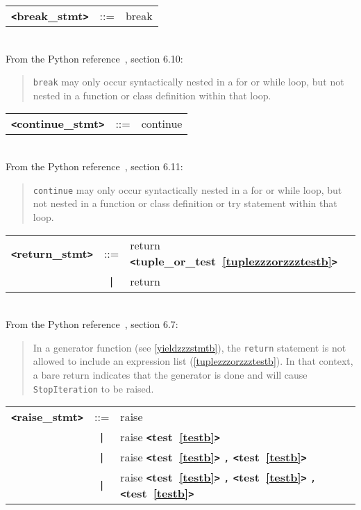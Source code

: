 \label{breakzzzstmtb}
\begin{tabular}{lcl}
{\bf \verb+<+break\_stmt\verb+>+} & ::=  & break \\
\end{tabular} \\

From the Python reference~\cite{pythonlang}, section 6.10:
\begin{quote}
\verb+break+ may only occur syntactically nested in a for or while loop, 
but not nested in a function or class definition within that loop.
\end{quote}

\label{continuezzzstmtb}
\begin{tabular}{lcl}
{\bf \verb+<+continue\_stmt\verb+>+} & ::=  & continue \\
\end{tabular} \\

From the Python reference~\cite{pythonlang}, section 6.11:
\begin{quote}
\verb|continue| may only occur syntactically nested in a for or while loop, 
but not nested in a function or class definition or try statement within 
that loop.
\end{quote}

\label{returnzzzstmtb}
\begin{tabular}{lcl}
{\bf \verb+<+return\_stmt\verb+>+} & ::=  & return {\bf \verb+<+tuple\_or\_test~\ref{tuplezzzorzzztestb}\verb+>+}  \\
 & \verb+|+  & return \\
\end{tabular} \\

From the Python reference~\cite{pythonlang}, section 6.7:
\begin{quote}
In a generator function (see \ref{yieldzzzstmtb}), 
the \verb|return| statement is not allowed to include an expression list (\ref{tuplezzzorzzztestb}). In that context, a bare return indicates that the generator is done and will cause \verb|StopIteration| to be raised.
\end{quote}

\label{raisezzzstmtb}
\begin{tabular}{lcl}
{\bf \verb+<+raise\_stmt\verb+>+} & ::=  & raise \\
 & \verb+|+  & raise {\bf \verb+<+test~\ref{testb}\verb+>+}  \\
 & \verb+|+  & raise {\bf \verb+<+test~\ref{testb}\verb+>+}  \verb|,| {\bf \verb+<+test~\ref{testb}\verb+>+}  \\
 & \verb+|+  & raise {\bf \verb+<+test~\ref{testb}\verb+>+}  \verb|,| {\bf \verb+<+test~\ref{testb}\verb+>+}  \verb|,| {\bf \verb+<+test~\ref{testb}\verb+>+}  \\
\end{tabular} \\

